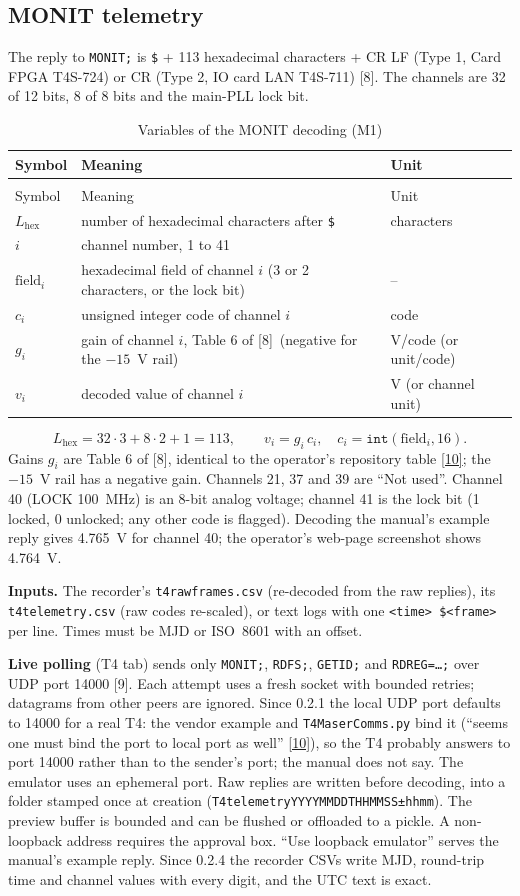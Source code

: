 \documentclass[11pt,a4paper]{article}
\makeatletter
\newcommand{\tfourman}{[8]}
\newcommand{\tfournet}{[9]}
\newcommand{\tfoursrc}{\href{https://github.com/Braveheart53/GBO_Maser_Control}{[10]}}
\renewcommand{\_}{\usscore\allowbreak}
\newenvironment{vartable}[2]{%
 \par\small\setlength{\LTpre}{3pt}\setlength{\LTpost}{3pt}%
 \begin{longtable}{@{}>{\raggedright}p{.2\linewidth}>{\raggedright}p{.57\linewidth}>{\raggedright\arraybackslash}p{.17\linewidth}@{}}
 \caption{#2}\label{#1}\\
 \toprule Symbol & Meaning & Unit\\\midrule
 \endfirsthead
 \multicolumn{3}{@{}l}{\footnotesize\itshape Table \thetable{} (continued)}\\
 \toprule Symbol & Meaning & Unit\\\midrule
 \endhead
 \bottomrule
 \endlastfoot}
 {\end{longtable}\normalsize}
\makeatother
\begin{document}
\subsection{MONIT telemetry}
The reply to \texttt{MONIT;} is \texttt{\$} + 113 hexadecimal characters + CR LF (Type 1, Card
FPGA T4S-724) or CR (Type 2, IO card LAN T4S-711) \tfourman. The channels are 32 of 12 bits,
8 of 8 bits and the main-PLL lock bit.
\begin{vartable}{tab:var-M}{Variables of the MONIT decoding (M1)}
\(L_{\mathrm{hex}}\) & number of hexadecimal characters after \texttt{\$} & characters\\
\(i\) & channel number, 1 to 41 & 1\\
\(\text{field}_i\) & hexadecimal field of channel \(i\) (3 or 2 characters, or the lock bit) & --\\
\(c_i\) & unsigned integer code of channel \(i\) & code\\
\(g_i\) & gain of channel \(i\), Table 6 of \tfourman\ (negative for the \(-15\)~V rail) & V/code (or unit/code)\\
\(v_i\) & decoded value of channel \(i\) & V (or channel unit)\\
\end{vartable}
\begin{equation}
L_{\mathrm{hex}}=32\cdot3+8\cdot2+1=113,\qquad v_i=g_i\,c_i,\quad c_i=\texttt{int}(\text{field}_i,16). \tag{M1}\label{eq:M1}
\end{equation}
Gains $g_i$ are Table 6 of \tfourman, identical to the operator's repository table \tfoursrc;
the $-15$~V rail has a negative gain. Channels 21, 37 and 39 are ``Not used''. Channel 40
(LOCK 100~MHz) is an 8-bit analog voltage; channel 41 is the lock bit (1 locked, 0 unlocked;
any other code is flagged). Decoding the manual's example reply gives 4.765~V for channel 40;
the operator's web-page screenshot shows 4.764~V.

\textbf{Inputs.} The recorder's \texttt{t4\_raw\_frames.csv} (re-decoded from the raw replies),
its \texttt{t4\_telemetry.csv} (raw codes re-scaled), or text logs with one
\texttt{<time> \$<frame>} per line. Times must be MJD or ISO~8601 with an offset.

\textbf{Live polling} (T4 tab) sends only \texttt{MONIT;}, \texttt{RDFS;}, \texttt{GETID;} and
\texttt{RDREG=\dots;} over UDP port 14000 \tfournet. Each attempt uses a fresh socket with bounded
retries; datagrams from other peers are ignored. Since 0.2.1 the local UDP port defaults to
14000 for a real T4: the vendor example and \texttt{T4\_Maser\_Comms.py} bind it (``seems one
must bind the port to local port as well'' \tfoursrc), so the T4 probably answers to port 14000
rather than to the sender's port; the manual does not say. The emulator uses an ephemeral port.
Raw replies are written before decoding, into a folder stamped once at creation
(\texttt{T4\_telemetry\_YYYYMMDDTHHMMSS±hhmm}). The preview buffer is bounded and can be flushed or
offloaded to a pickle. A non-loopback address requires the approval box. ``Use loopback emulator''
serves the manual's example reply. Since 0.2.4 the recorder CSVs write MJD, round-trip time and
channel values with every digit, and the UTC text is exact.
\end{document}
